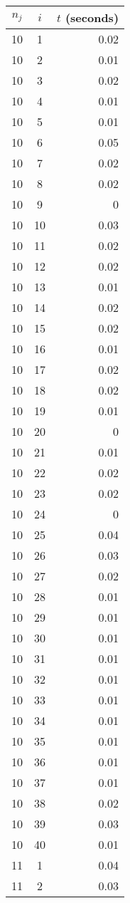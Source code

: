 \documentclass[13pt, letterpaper, oneside]{book}
\begin{document}
\tiny
\begin{multicols}{5}
\begin{tabular}{c c r}
\toprule
$n_j$ & $i$ & $t$ (seconds) \\
\midrule 
10 & 1 & 0.02 \\
10 & 2 & 0.01 \\
10 & 3 & 0.02 \\
10 & 4 & 0.01 \\
10 & 5 & 0.01 \\
10 & 6 & 0.05 \\
10 & 7 & 0.02 \\
10 & 8 & 0.02 \\
10 & 9 & 0 \\
10 & 10 & 0.03 \\
10 & 11 & 0.02 \\
10 & 12 & 0.02 \\
10 & 13 & 0.01 \\
10 & 14 & 0.02 \\
10 & 15 & 0.02 \\
10 & 16 & 0.01 \\
10 & 17 & 0.02 \\
10 & 18 & 0.02 \\
10 & 19 & 0.01 \\
10 & 20 & 0 \\
10 & 21 & 0.01 \\
10 & 22 & 0.02 \\
10 & 23 & 0.02 \\
10 & 24 & 0 \\
10 & 25 & 0.04 \\
10 & 26 & 0.03 \\
10 & 27 & 0.02 \\
10 & 28 & 0.01 \\
10 & 29 & 0.01 \\
10 & 30 & 0.01 \\
10 & 31 & 0.01 \\
10 & 32 & 0.01 \\
10 & 33 & 0.01 \\
10 & 34 & 0.01 \\
10 & 35 & 0.01 \\
10 & 36 & 0.01 \\
10 & 37 & 0.01 \\
10 & 38 & 0.02 \\
10 & 39 & 0.03 \\
10 & 40 & 0.01 \\
11 & 1 & 0.04 \\
11 & 2 & 0.03 \\

\end{tabular}
\end{multicols}
\end{document}
